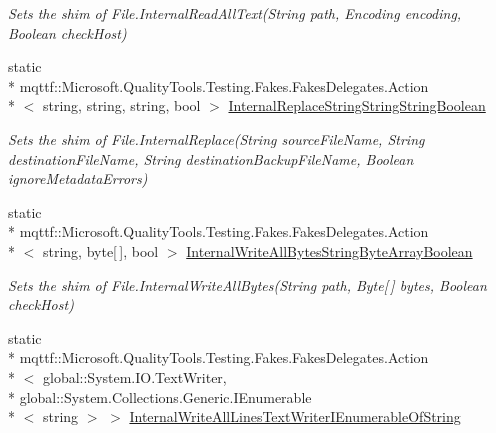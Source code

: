 \begin{DoxyCompactItemize}
\begin{DoxyCompactList}\small\item\em Sets the shim of File.\-Internal\-Read\-All\-Text(\-String path, Encoding encoding, Boolean check\-Host)\end{DoxyCompactList}\item 
static \\*
mqttf\-::\-Microsoft.\-Quality\-Tools.\-Testing.\-Fakes.\-Fakes\-Delegates.\-Action\\*
$<$ string, string, string, bool $>$ \hyperlink{class_system_1_1_i_o_1_1_fakes_1_1_shim_file_a0595ad9f77523e1f54758981afabb8ca}{Internal\-Replace\-String\-String\-String\-Boolean}
\begin{DoxyCompactList}\small\item\em Sets the shim of File.\-Internal\-Replace(\-String source\-File\-Name, String destination\-File\-Name, String destination\-Backup\-File\-Name, Boolean ignore\-Metadata\-Errors)\end{DoxyCompactList}\item 
static \\*
mqttf\-::\-Microsoft.\-Quality\-Tools.\-Testing.\-Fakes.\-Fakes\-Delegates.\-Action\\*
$<$ string, byte\mbox{[}$\,$\mbox{]}, bool $>$ \hyperlink{class_system_1_1_i_o_1_1_fakes_1_1_shim_file_a850a9635ade7222bb31e49ec8da8ca98}{Internal\-Write\-All\-Bytes\-String\-Byte\-Array\-Boolean}
\begin{DoxyCompactList}\small\item\em Sets the shim of File.\-Internal\-Write\-All\-Bytes(\-String path, Byte\mbox{[}$\,$\mbox{]} bytes, Boolean check\-Host)\end{DoxyCompactList}\item 
static \\*
mqttf\-::\-Microsoft.\-Quality\-Tools.\-Testing.\-Fakes.\-Fakes\-Delegates.\-Action\\*
$<$ global\-::\-System.\-I\-O.\-Text\-Writer, \\*
global\-::\-System.\-Collections.\-Generic.\-I\-Enumerable\\*
$<$ string $>$ $>$ \hyperlink{class_system_1_1_i_o_1_1_fakes_1_1_shim_file_a5bd7106bd8a8160b188c07c706a063a2}{Internal\-Write\-All\-Lines\-Text\-Writer\-I\-Enumerable\-Of\-String}

\end{DoxyCompactItemize}
